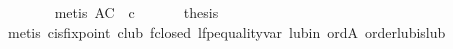 \begin{isabellebody}
\ \ \ \ \ \ \isamarkupfalse%
\ {}metis\ {}{}\isactrlbsub AC\ {}\ c{}{}\isanewline
\ \ \isamarkupfalse%
\isanewline
\ \ \isamarkupfalse%
\ {}thesis\isanewline
\ \ \ \ \isamarkupfalse%
\ {}metis\ c{}is{}fixpoint\ c{}lub\ f{}closed\ lfp{}equality{}var\ lub{}in\ ord{}A\ order{}lub{}is{}lub{}\isanewline
{}\isamarkupfalse%
%
\endisatagproof
{\isafoldproof}%
%
\isadelimproof
\isanewline
%
\endisadelimproof
%
\isadelimtheory
\isanewline
%
\endisadelimtheory
%
\isatagtheory
{}\isamarkupfalse%
%
\endisatagtheory
{\isafoldtheory}%
%
\isadelimtheory
\isanewline
%
\endisadelimtheory
\end{isabellebody}%
